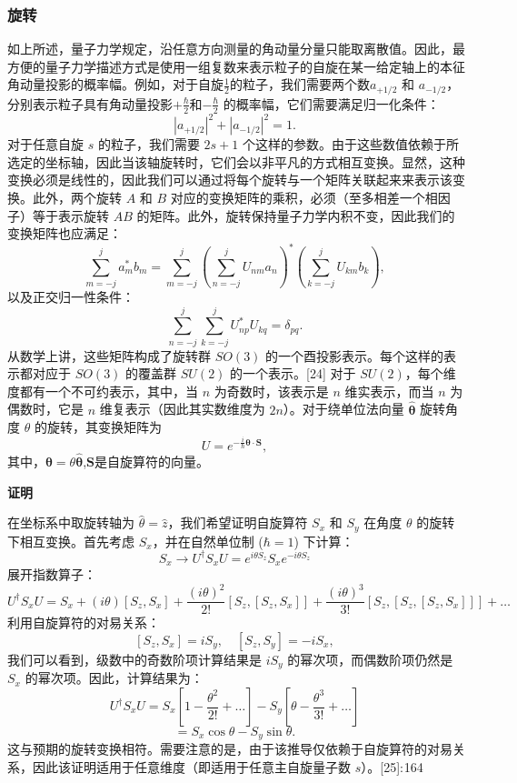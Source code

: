 \subsubsection{旋转}  
如上所述，量子力学规定，沿任意方向测量的角动量分量只能取离散值。因此，最方便的量子力学描述方式是使用一组复数来表示粒子的自旋在某一给定轴上的本征角动量投影的概率幅。例如，对于自旋\( \frac{1}{2} \)的粒子，我们需要两个数\( a_{+1/2} \) 和 \( a_{-1/2}\)，分别表示粒子具有角动量投影\( +\frac{\hbar}{2} \)和\( -\frac{\hbar}{2}\) 的概率幅，它们需要满足归一化条件：  
\[
|a_{+1/2}|^{2} + |a_{-1/2}|^{2} = 1.~
\]
对于任意自旋 \( s \) 的粒子，我们需要 \( 2s + 1 \) 个这样的参数。由于这些数值依赖于所选定的坐标轴，因此当该轴旋转时，它们会以非平凡的方式相互变换。显然，这种变换必须是线性的，因此我们可以通过将每个旋转与一个矩阵关联起来来表示该变换。此外，两个旋转 \( A \) 和 \( B \) 对应的变换矩阵的乘积，必须（至多相差一个相因子）等于表示旋转 \( AB \) 的矩阵。此外，旋转保持量子力学内积不变，因此我们的变换矩阵也应满足：  
\[
\sum _{m=-j}^{j} a_m^{*} b_m = \sum _{m=-j}^{j} \left( \sum _{n=-j}^{j} U_{nm} a_n \right)^{*} \left( \sum _{k=-j}^{j} U_{km} b_k \right),~
\]
以及正交归一性条件：  
\[
\sum _{n=-j}^{j} \sum _{k=-j}^{j} U_{np}^{*} U_{kq} = \delta _{pq}.~
\]
从数学上讲，这些矩阵构成了旋转群 \( SO(3) \) 的一个酉投影表示。每个这样的表示都对应于 \( SO(3) \) 的覆盖群 \( SU(2) \) 的一个表示。[24] 对于 \( SU(2) \)，每个维度都有一个不可约表示，其中，当 \( n \) 为奇数时，该表示是 \( n \) 维实表示，而当 \( n \) 为偶数时，它是 \( n \) 维复表示（因此其实数维度为 \( 2n \)）。对于绕单位法向量 \( \hat{\boldsymbol{\theta}} \) 旋转角度 \( \theta \) 的旋转，其变换矩阵为  
\[
U = e^{-\frac{i}{\hbar} \boldsymbol{\theta} \cdot \mathbf{S}},~
\]
其中，\(\boldsymbol{\theta} = \theta \hat{\boldsymbol{\theta}}\),\( \mathbf{S}\)是自旋算符的向量。

\textbf{证明} 

在坐标系中取旋转轴为 \( \hat{\theta} = \hat{z} \)，我们希望证明自旋算符 \( S_x \) 和 \( S_y \) 在角度 \( \theta \) 的旋转下相互变换。首先考虑 \( S_x \)，并在自然单位制 (\( \hbar = 1 \)) 下计算：
\[
S_x \rightarrow U^{\dagger} S_x U = e^{i\theta S_z} S_x e^{-i\theta S_z}~
\]
展开指数算子：
\[
U^{\dagger} S_x U = S_x + (i\theta) [S_z, S_x] + \frac{(i\theta)^2}{2!} [S_z, [S_z, S_x]] + \frac{(i\theta)^3}{3!} [S_z, [S_z, [S_z, S_x]]] + \dots~
\]
利用自旋算符的对易关系：
\[
[S_z, S_x] = i S_y, \quad [S_z, S_y] = -i S_x,~
\]
我们可以看到，级数中的奇数阶项计算结果是 \( i S_y \) 的幂次项，而偶数阶项仍然是 \( S_x \) 的幂次项。因此，计算结果为：
\[
U^{\dagger} S_x U = S_x \left[1 - \frac{\theta^2}{2!} + \dots \right] - S_y \left[\theta - \frac{\theta^3}{3!} + \dots \right]~
\]
\[
= S_x \cos\theta - S_y \sin\theta.~
\]
这与预期的旋转变换相符。需要注意的是，由于该推导仅依赖于自旋算符的对易关系，因此该证明适用于任意维度（即适用于任意主自旋量子数 \( s \)）。[25]: 164

